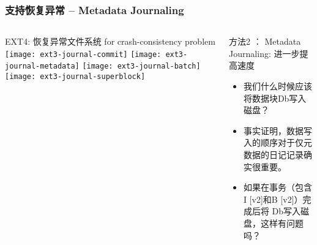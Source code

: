 \begin{frame}[fragile]
	\frametitle{支持恢复异常 -- Metadata Journaling}
	\begin{columns}
		\begin{column}{.5\textwidth}
			EXT4: 恢复异常文件系统 for crash-consistency problem
			\texttt{[image: ext3-journal-commit]}
			\texttt{[image: ext3-journal-metadata]}
			\texttt{[image: ext3-journal-batch]}
			\texttt{[image: ext3-journal-superblock]}
		\end{column}
		\begin{column}{.5\textwidth}			
			方法2 ： Metadata Journaling: 进一步提高速度
			\begin{itemize}
				\item  我们什么时候应该将数据块Db写入磁盘？ \pause
				\item 事实证明，数据写入的顺序对于仅元数据的日记记录确实很重要。
				\item  如果在事务（包含I [v2]和B [v2]）完成后将 Db写入磁盘，这样有问题吗？
			\end{itemize}
%				
		\end{column}
	\end{columns}
	
\end{frame}


